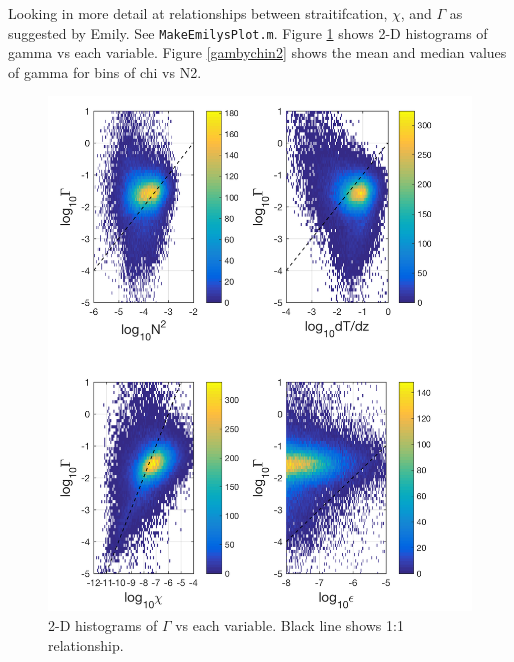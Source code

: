 \documentclass[11pt]{article}
\begin{document}
Looking in more detail at relationships between straitifcation, $\chi$, and $\Gamma$ as suggested by Emily. See \verb+MakeEmilysPlot.m+. Figure \ref{2x2hist} shows 2-D histograms of gamma vs each variable. Figure \ref{gambychin2} shows the mean and median values of gamma for bins of chi vs N2.


\begin{figure}[htbp]
\includegraphics[scale=0.8]{2X2_2dhist_Gamma.png}
\caption{2-D histograms of $\Gamma$ vs each variable. Black line shows 1:1 relationship.}
\label{2x2hist}
\end{figure}
\end{document}
